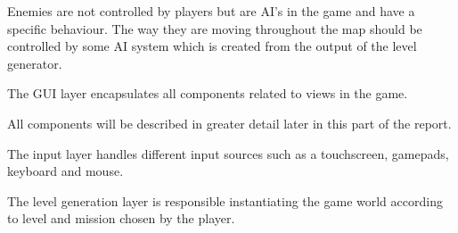 Enemies are not controlled by players but are AI's in the game and have a specific behaviour.
The way they are moving throughout the map should be controlled by some AI system which is created from the output of the level generator.

The GUI layer encapsulates all components related to views in the game.

All components will be described in greater detail later in this part of the report.

The input layer handles different input sources such as a touchscreen, gamepads, keyboard and mouse.

The level generation layer is responsible instantiating the game world according to level and mission chosen by the player.
